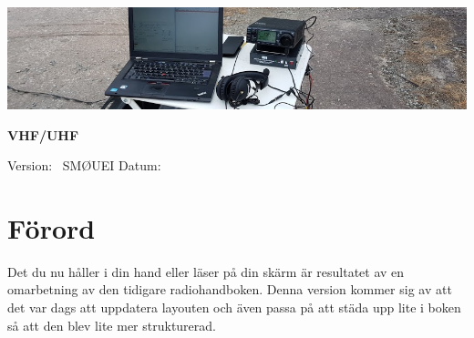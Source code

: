 
	
	
	\pagestyle{empty}
	\vfill
	\vspace*{4cm}
	\centerline{\includegraphics[width=\paperwidth]{logo/rubrikbild}}
	\begin{flushright}
		\Huge{\bfseries{\TitleText} VHF/UHF} \\[3mm]
		\Large{\bfseries{\SubtitleText}}
	\end{flushright}
	
	\vfill
	
	Version: \DokVersion\ \hfill SMØUEI \hfill Datum: \DokumentDatum
	
	\newpage
	
	
	\pagestyle{fancy}
	\lhead{\leftmark}	
	
	\chead{}
	
	
	\cfoot{\scriptsize \thepage\ / \pageref{LastPage}}
	
	
	\renewcommand{\footrulewidth}{0.2pt}
	
	
	
	\cleardoublepage
	
	\tableofcontents
	
	\newpage
	
	\setlength{\parskip}{0.5em}
	\setlength{\parindent}{0pt}

\section*{Förord}
	
Det du nu håller i din hand eller läser på din skärm är resultatet av
en omarbetning av den tidigare radiohandboken. Denna version kommer
sig av att det var dags att uppdatera layouten och även passa på att
städa upp lite i boken så att den blev lite mer strukturerad.
	
